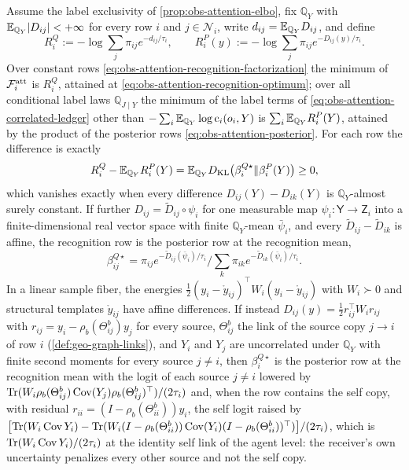 Assume the label exclusivity of \cref{prop:obs-attention-elbo}, fix
\(\mathbb Q_Y\) with \(\mathbb E_{\mathbb Q_Y}\lvert D_{ij}\rvert<+\infty\) for every
row \(i\) and \(j\in\mathcal N_i\), write \(d_{ij}=\mathbb E_{\mathbb Q_Y}D_{ij}\), and
define
\begin{equation}
R_i^Q:=-\log\sum_j\pi_{ij}e^{-d_{ij}/\tau_i},
\qquad
R_i^P(y):=-\log\sum_j\pi_{ij}e^{-D_{ij}(y)/\tau_i}.
\label{eq:obs-attention-row-potentials}
\end{equation}
Over constant rows \eqref{eq:obs-attention-recognition-factorization} the
minimum of \(\mathcal F_i^{\rm att}\) is \(R_i^Q\), attained at
\eqref{eq:obs-attention-recognition-optimum}; over all conditional label laws
\(\mathbb Q_{J\mid Y}\) the minimum of the label terms of
\eqref{eq:obs-attention-correlated-ledger} other than
\(-\sum_i\mathbb E_{\mathbb Q_Y}\log\mathrm c_i(o_i,Y)\) is
\(\sum_i\mathbb E_{\mathbb Q_Y}R_i^P(Y)\), attained by the product of the posterior
rows \eqref{eq:obs-attention-posterior}. For each row the difference is exactly
\begin{equation}
R_i^Q-\mathbb E_{\mathbb Q_Y}R_i^P(Y)
=\mathbb E_{\mathbb Q_Y}D_{\mathrm{KL}}\bigl(\beta_i^{Q\star}\Vert\beta_i^P(Y)\bigr)\geq0,
\label{eq:obs-attention-jensen-gap}
\end{equation}
which vanishes exactly when every difference \(D_{ij}(Y)-D_{ik}(Y)\) is
\(\mathbb Q_Y\)-almost surely constant. If further
\(D_{ij}=\widetilde D_{ij}\circ\psi_i\) for one measurable map
\(\psi_i:\mathsf Y\to\mathsf Z_i\) into a finite-dimensional real vector space
with finite \(\mathbb Q_Y\)-mean \(\bar\psi_i\), and every
\(\widetilde D_{ij}-\widetilde D_{ik}\) is affine, the recognition row is the
posterior row at the recognition mean,
\begin{equation}
\beta^{Q\star}_{ij}
=\pi_{ij}e^{-\widetilde D_{ij}(\bar\psi_i)/\tau_i}\Big/\sum_k\pi_{ik}e^{-\widetilde D_{ik}(\bar\psi_i)/\tau_i}.
\label{eq:obs-attention-affine-row}
\end{equation}
In a linear sample fiber, the energies
\(\frac12(y_i-\mathring y_{ij})^\top W_i(y_i-\mathring y_{ij})\) with
\(W_i\succ0\) and structural templates \(\mathring y_{ij}\) have affine
differences. If instead \(D_{ij}(y)=\frac12 r_{ij}^\top W_ir_{ij}\) with
\(r_{ij}=y_i-\rho_b(\Theta^b_{ij})y_j\) for every source, \(\Theta^b_{ij}\) the
link of the source copy \(j\to i\) of row \(i\) (\cref{def:geo-graph-links}),
and \(Y_i\) and \(Y_j\) are uncorrelated under \(\mathbb Q_Y\) with finite
second moments for every source \(j\ne i\), then \(\beta_i^{Q\star}\) is the
posterior row at the recognition mean with the logit of each source \(j\ne i\)
lowered by \(\operatorname{Tr}(W_i\rho_b(\Theta^b_{ij})\operatorname{Cov}(Y_j)
\rho_b(\Theta^b_{ij})^\top)/(2\tau_i)\) and, when the row contains the self
copy, with residual \(r_{ii}=(I-\rho_b(\Theta^b_{ii}))y_i\), the self logit
raised by
\(\bigl[\operatorname{Tr}(W_i\operatorname{Cov}Y_i)-\operatorname{Tr}(W_i(I-\rho_b(\Theta^b_{ii}))
\operatorname{Cov}(Y_i)(I-\rho_b(\Theta^b_{ii}))^\top)\bigr]/(2\tau_i)\),
which is \(\operatorname{Tr}(W_i\operatorname{Cov}Y_i)/(2\tau_i)\) at the identity self link
of the agent level: the receiver's own uncertainty penalizes every other
source and not the self copy.

